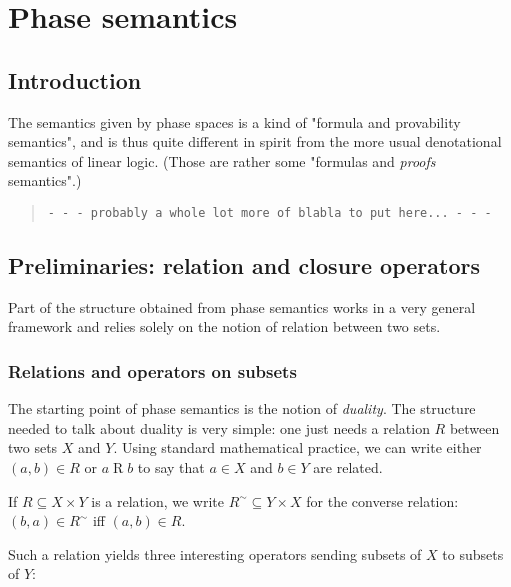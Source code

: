\chapter{Phase semantics}\label{phase-semantics}

\section{Introduction}\label{introduction}

The semantics given by phase spaces is a kind of "formula and
provability semantics", and is thus quite different in spirit from the
more usual denotational semantics of linear logic. (Those are rather
some "formulas and \emph{proofs} semantics".)

\begin{quotation}
\texttt{- - - probably a whole lot more of blabla to put here... - - -}
\end{quotation}

\section{Preliminaries: relation and closure operators}\label{preliminaries-relation-and-closure-operators}

Part of the structure obtained from phase semantics works in a very
general framework and relies solely on the notion of relation between
two sets.

\subsection{Relations and operators on subsets}\label{relations-and-operators-on-subsets}

The starting point of phase semantics is the notion of \emph{duality}.
The structure needed to talk about duality is very simple: one just
needs a relation \(R\) between two sets \(X\) and \(Y\). Using standard
mathematical practice, we can write either \((a,b) \in R\) or
\(a\mathrel{R} b\) to say that \(a\in X\) and \(b\in Y\) are related.

\begin{definition}
If $R\subseteq X\times Y$ is a relation, we write $R^\sim\subseteq Y\times X$ for the converse relation: $(b,a)\in R^\sim$ iff $(a,b)\in R$.
\end{definition}

Such a relation yields three interesting operators sending subsets of
\(X\) to subsets of \(Y\):


